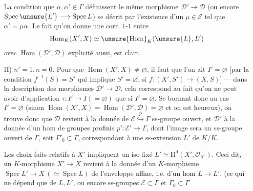 La condition que $\alpha,\alpha'\in\Gamma$ définissent le même morphisme $\mathcal D'\longrightarrow\mathcal D$ (ou encore $\operatorname{Spec}\unsure{L'}\longrightarrow\operatorname{Spec}L$) se décrit par l'existence d'un $\mu\in\mathcal E$  tel que $\alpha'=\mu\alpha$.
Le fait qu'on donne une corr. $1$-$1$ entre
\[
\operatorname{Hom}_{K}(X',X)\simeq\unsure{\operatorname{Hom}}_{K}(\unsure{L},L')
\]
avec $\operatorname{Hom}(\mathcal D',\mathcal D)$ explicité aussi, est clair.

II) $n'=1,n=0$.
 Pour que $\operatorname{Hom}(X',X)\ne\varnothing$, il faut que l'on ait $I'=\varnothing$
[par la condition $f^{-1}(S)=S'$ qui implique $S'=\varnothing$, si $f:(X',S')\longrightarrow(X,S)$]
---  dans la description des morphismes $\mathcal D'\longrightarrow\mathcal D$, cela correspond au fait qu'on ne peut avoir d'application $\tau:I'\longrightarrow I(=\varnothing)$ que si $I'=\varnothing$.
Se bornant donc au cas $I'=\varnothing$ (sinon $\operatorname{Hom}(X',X)=\operatorname{Hom}(\mathcal D',\mathcal D)=\varnothing$ et on est heureux), on trouve donc que $\mathcal D$ revient à la donnée de $\mathcal E\overset{p}{\hookrightarrow}\Gamma$ ss-groupe ouvert, et $\mathcal D'$ à la donnée d'un hom de groupes profinis $p':\mathcal E'\longrightarrow\Gamma$, dont l'image sera un ss-groupe ouvert de $\Gamma$, soit $\Gamma'_0\subset\Gamma$, correspondant à une ss-extension  $L'$ de $\overline K/K$.

Les choix faits relatifs à $X'$ impliquent  un iso fixé $L'\simeq\mathrm H^0(X',\mathcal O_{X'})$.
Ceci dit, un $K$-morphisme  $X'\longrightarrow X$ revient  à la donnée d'un $K$-morphisme $\operatorname{Spec}L'\longrightarrow X\ (\simeq\operatorname{Spec}L)$ de l'enveloppe affine, i.e. d'un hom $L\longrightarrow L'$.
(ce qui ne dépend que de $L,L'$, ou encore   ss-groupes $\mathcal E\subset\Gamma$ et $\Gamma_0\subset\Gamma$

